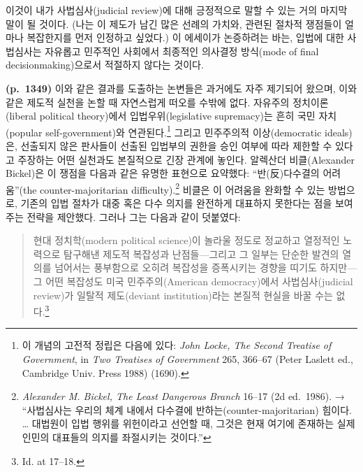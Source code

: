 \documentclass[a4paper,12pt,oneside]{article}  %
\begin{document}
이것이 내가 사법심사(judicial review)에 대해 긍정적으로 말할 수 있는
거의 마지막 말이 될 것이다. (나는 이 제도가 남긴 많은 선례의 가치와,
관련된 절차적 쟁점들이 얼마나 복잡한지를 먼저 인정하고 싶었다.) 이
에세이가 논증하려는 바는, 입법에 대한 사법심사는 자유롭고 민주적인
사회에서 최종적인 의사결정 방식(mode of final decisionmaking)으로서
적절하지 않다는 것이다.

\textbf{(p.~1349)} 이와 같은 결과를 도출하는 논변들은 과거에도 자주
제기되어 왔으며, 이와 같은 제도적 실천을 논할 때 자연스럽게 떠오를
수밖에 없다. 자유주의 정치이론(liberal political theory)에서
입법우위(legislative supremacy)는 흔히 국민 자치(popular
self-government)와 연관된다.\footnote{이 개념의 고전적 정립은 다음에
  있다: \emph{John Locke, The Second Treatise of Government}, in
  \emph{Two Treatises of Government} 265, 366--67 (Peter Laslett ed.,
  Cambridge Univ. Press 1988) (1690).} 그리고 민주주의적 이상(democratic
ideals)은, 선출되지 않은 판사들이 선출된 입법부의 권한을 승인 여부에
따라 제한할 수 있다고 주장하는 어떤 실천과도 본질적으로 긴장 관계에
놓인다. 알렉산더 비클(Alexander Bickel)은 이 쟁점을 다음과 같은 유명한
표현으로 요약했다: ``반(反)다수결의 어려움''(the counter-majoritarian
difficulty).\footnote{\emph{Alexander M. Bickel, The Least Dangerous
  Branch} 16--17 (2d ed.~1986). → ``사법심사는 우리의 체계 내에서
  다수결에 반하는(counter-majoritarian) 힘이다. \ldots{} 대법원이 입법
  행위를 위헌이라고 선언할 때, 그것은 현재 여기에 존재하는 실제 인민의
  대표들의 의지를 좌절시키는 것이다.''} 비클은 이 어려움을 완화할 수
있는 방법으로, 기존의 입법 절차가 대중 혹은 다수 의지를 완전하게
대표하지 못한다는 점을 보여주는 전략을 제안했다. 그러나 그는 다음과 같이
덧붙였다:

\begin{quote}
현대 정치학(modern political science)이 놀라울 정도로 정교하고 열정적인
노력으로 탐구해낸 제도적 복잡성과 난점들---그리고 그 일부는 단순한
발견의 열의를 넘어서는 풍부함으로 오히려 복잡성을 증폭시키는 경향을
띠기도 하지만---그 어떤 복잡성도 미국 민주주의(American democracy)에서
사법심사(judicial review)가 일탈적 제도(deviant institution)라는 본질적
현실을 바꿀 수는 없다.\footnote{Id. at 17--18.}
\end{quote}
\end{document}
